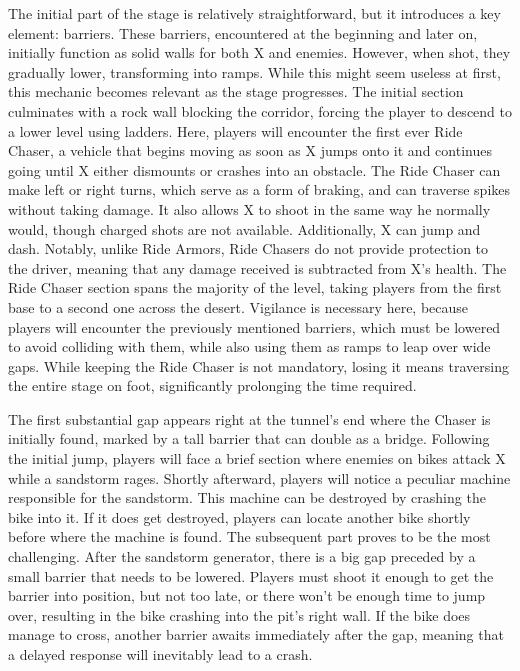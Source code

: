 The initial part of the stage is relatively straightforward, but it introduces a key element: barriers. These barriers, encountered at the beginning and later on, initially function as solid walls for both X and enemies. However, when shot, they gradually lower, transforming into ramps. While this might seem useless at first, this mechanic becomes relevant as the stage progresses. The initial section culminates with a rock wall blocking the corridor, forcing the player to descend to a lower level using ladders. Here, players will encounter the first ever Ride Chaser, a vehicle that begins moving as soon as X jumps onto it and continues going until X either dismounts or crashes into an obstacle. The Ride Chaser can make left or right turns, which serve as a form of braking, and can traverse spikes without taking damage. It also allows X to shoot in the same way he normally would, though charged shots are not available. Additionally, X can jump and dash. Notably, unlike Ride Armors, Ride Chasers do not provide protection to the driver, meaning that any damage received is subtracted from X's health. The Ride Chaser section spans the majority of the level, taking players from the first base to a second one across the desert. Vigilance is necessary here, because players will encounter the previously mentioned barriers, which must be lowered to avoid colliding with them, while also using them as ramps to leap over wide gaps. While keeping the Ride Chaser is not mandatory, losing it means traversing the entire stage on foot, significantly prolonging the time required.

The first substantial gap appears right at the tunnel's end where the Chaser is initially found, marked by a tall barrier that can double as a bridge. Following the initial jump, players will face a brief section where enemies on bikes attack X while a sandstorm rages. Shortly afterward, players will notice a peculiar machine responsible for the sandstorm. This machine can be destroyed by crashing the bike into it. If it does get destroyed, players can locate another bike shortly before where the machine is found. The subsequent part proves to be the most challenging. After the sandstorm generator, there is a big gap preceded by a small barrier that needs to be lowered. Players must shoot it enough to get the barrier into position, but not too late, or there won't be enough time to jump over, resulting in the bike crashing into the pit's right wall. If the bike does manage to cross, another barrier awaits immediately after the gap, meaning that a delayed response will inevitably lead to a crash.

